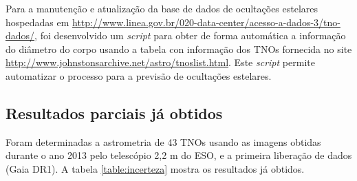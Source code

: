 \documentclass[a4paper, 11pt]{article}
\begin{document}
Para a manutenção e atualização da base de dados de ocultações estelares hospedadas em \url{http://www.linea.gov.br/020-data-center/acesso-a-dados-3/tno-dados/}, foi desenvolvido um \textit{script} para obter de forma automática a informação do diâmetro do corpo usando a tabela con informação dos TNOs fornecida no site \url{http://www.johnstonsarchive.net/astro/tnoslist.html}. Este \textit{script} permite automatizar o processo para a previsão de ocultações estelares.     

\subsection{Resultados parciais já obtidos}

Foram determinadas a astrometria de 43 TNOs usando as imagens obtidas durante o ano 2013 pelo telescópio 2,2 m do ESO, e a primeira liberação de dados (Gaia DR1). A tabela \ref{table:incerteza} mostra os resultados já obtidos.  
\end{document}
